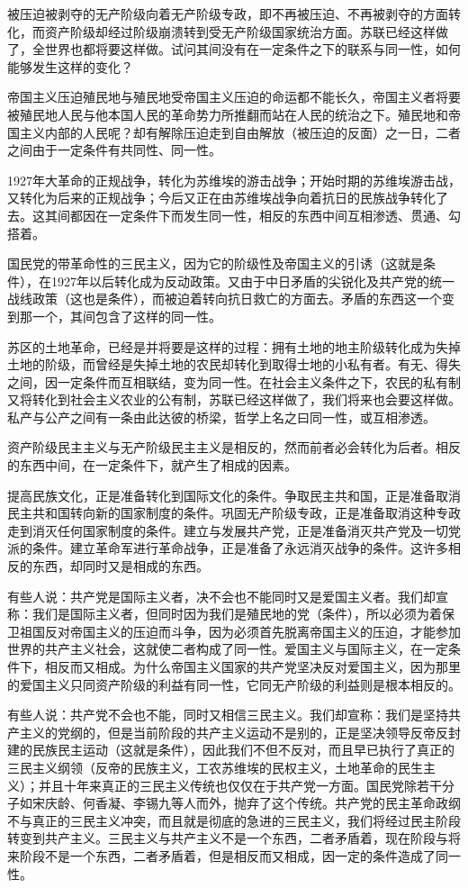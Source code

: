 被压迫被剥夺的无产阶级向着无产阶级专政，即不再被压迫、不再被剥夺的方面转化，而资产阶级却经过阶级崩溃转到受无产阶级国家统治方面。苏联已经这样做了，全世界也都将要这样做。试问其间没有在一定条件之下的联系与同一性，如何能够发生这样的变化？

帝国主义压迫殖民地与殖民地受帝国主义压迫的命运都不能长久，帝国主义者将要被殖民地人民与他本国人民的革命势力所推翻而站在人民的统治之下。殖民地和帝国主义内部的人民呢？却有解除压迫走到自由解放（被压迫的反面）之一日，二者之间由于一定条件有共同性、同一性。

1927年大革命的正规战争，转化为苏维埃的游击战争；开始时期的苏维埃游击战，又转化为后来的正规战争；今后又正在由苏维埃战争向着抗日的民族战争转化了去。这其间都因在一定条件下而发生同一性，相反的东西中间互相渗透、贯通、勾搭着。

国民党的带革命性的三民主义，因为它的阶级性及帝国主义的引诱（这就是条件），在1927年以后转化成为反动政策。又由于中日矛盾的尖锐化及共产党的统一战线政策（这也是条件），而被迫着转向抗日救亡的方面去。矛盾的东西这一个变到那一个，其间包含了这样的同一性。

苏区的土地革命，已经是并将要是这样的过程：拥有土地的地主阶级转化成为失掉土地的阶级，而曾经是失掉土地的农民却转化到取得士地的小私有者。有无、得失之间，因一定条件而互相联结，变为同一性。在社会主义条件之下，农民的私有制又将转化到社会主义农业的公有制，苏联已经这样做了，我们将来也会要这样做。私产与公产之间有一条由此达彼的桥梁，哲学上名之曰同一性，或互相渗透。

资产阶级民主主义与无产阶级民主主义是相反的，然而前者必会转化为后者。相反的东西中间，在一定条件下，就产生了相成的因素。

提高民族文化，正是准备转化到国际文化的条件。争取民主共和国，正是准备取消民主共和国转向新的国家制度的条件。巩固无产阶级专政，正是准备取消这种专政走到消灭任何国家制度的条件。建立与发展共产党，正是准备消灭共产党及一切党派的条件。建立革命军进行革命战争，正是准备了永远消灭战争的条件。这许多相反的东西，却同时又是相成的东西。

有些人说：共产党是国际主义者，决不会也不能同时又是爱国主义者。我们却宣称：我们是国际主义者，但同时因为我们是殖民地的党（条件），所以必须为着保卫祖国反对帝国主义的压迫而斗争，因为必须首先脱离帝国主义的压迫，才能参加世界的共产主义社会，这就使二者构成了同一性。爱国主义与国际主义，在一定条件下，相反而又相成。为什么帝国主义国家的共产党坚决反对爱国主义，因为那里的爱国主义只同资产阶级的利益有同一性，它同无产阶级的利益则是根本相反的。

有些人说：共产党不会也不能，同时又相信三民主义。我们却宣称：我们是坚持共产主义的党纲的，但是当前阶段的共产主义运动不是别的，正是坚决领导反帝反封建的民族民主运动（这就是条件），因此我们不但不反对，而且早已执行了真正的三民主义纲领（反帝的民族主义，工农苏维埃的民权主义，土地革命的民生主义）；并且十年来真正的三民主义传统也仅仅在于共产党一方面。国民党除若干分子如宋庆龄、何香凝、李锡九等人而外，抛弃了这个传统。共产党的民主革命政纲不与真正的三民主义冲突，而且就是彻底的急进的三民主义，我们将经过民主阶段转变到共产主义。三民主义与共产主义不是一个东西，二者矛盾着，现在阶段与将来阶段不是一个东西，二者矛盾着，但是相反而又相成，因一定的条件造成了同一性。

